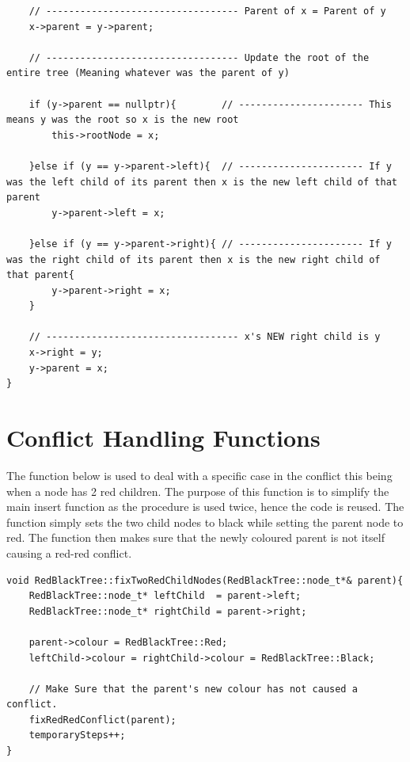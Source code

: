 \documentclass[12pt, a4paper]{report}
\begin{document}
\begin{verbatim}
    // ---------------------------------- Parent of x = Parent of y
    x->parent = y->parent;
    
    // ---------------------------------- Update the root of the entire tree (Meaning whatever was the parent of y)

    if (y->parent == nullptr){        // ---------------------- This means y was the root so x is the new root
        this->rootNode = x;
    
    }else if (y == y->parent->left){  // ---------------------- If y was the left child of its parent then x is the new left child of that parent
        y->parent->left = x;

    }else if (y == y->parent->right){ // ---------------------- If y was the right child of its parent then x is the new right child of that parent{
        y->parent->right = x;
    }

    // ---------------------------------- x's NEW right child is y
    x->right = y;
    y->parent = x;
}
\end{verbatim}

\section{Conflict Handling Functions}
The function below is used to deal with a specific case in the conflict this being when a node has 2 red children. The purpose of this function is to simplify the main insert function as the procedure is used twice, hence the code is reused. The function simply sets the two child nodes to black while setting the parent node to red. The function then makes sure that the newly coloured parent is not itself causing a red-red conflict.

\begin{verbatim}
void RedBlackTree::fixTwoRedChildNodes(RedBlackTree::node_t*& parent){
    RedBlackTree::node_t* leftChild  = parent->left;
    RedBlackTree::node_t* rightChild = parent->right;

    parent->colour = RedBlackTree::Red;
    leftChild->colour = rightChild->colour = RedBlackTree::Black;

    // Make Sure that the parent's new colour has not caused a conflict.
    fixRedRedConflict(parent);
    temporarySteps++;
}
\end{verbatim}
\end{document}
